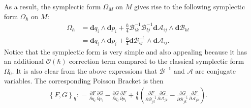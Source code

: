 \documentclass[10pt]{article}
\def\defeq{\mathrel{\mathop:}=}
\begin{document}
As a result, the symplectic form $\Omega_{M}$ on $M$ gives rise to the following symplectic form $\Omega_{\hbar}$ on $\overline{M}$:
\begin{equation}
  \label{eq:Omega}
  \begin{split}
    \Omega_{\hbar} &= \textbf{d}q_i \wedge \textbf{d}p_i + \frac{\hbar}{4} \mathcal{B}^{-1}_{ik} \mathcal{B}^{-1}_{lj}\textbf{d}\mathcal{A}_{ij}\wedge \textbf{d}\mathcal{B}_{kl}\\
    &= \textbf{d}q_i \wedge \textbf{d}p_i + \frac{\hbar}{4} \textbf{d}\mathcal{B}^{-1}_{ij} \wedge \textbf{d}\mathcal{A}_{ij}.
  \end{split}
\end{equation}
Notice that the symplectic form is very simple and also appealing because it has an additional $\mathcal{O}(\hbar)$ correction term compared to the classical symplectic form $\Omega_{0}$.
It is also clear from the above expressions that $\mathcal{B}^{-1}$ and $\mathcal{A}$ are conjugate variables.
The corresponding Poisson Bracket is then
\begin{align*}
  \left\{ F, G \right\}_{\hbar} \defeq
  \frac{\partial F}{\partial q_i}\frac{\partial G}{\partial p_i} - \frac{\partial G}{\partial q_i}\frac{\partial F}{\partial p_i}
  + \frac{4}{\hbar}\left(
  \frac{\partial F}{\partial \mathcal{B}_{jk}^{-1}}\frac{\partial G}{\partial \mathcal{A}_{jk}} - \frac{\partial G}{\partial \mathcal{B}^{-1}_{jk}}\frac{\partial F}{\partial \mathcal{A}_{jk}}
  \right).
\end{align*}
\end{document}
